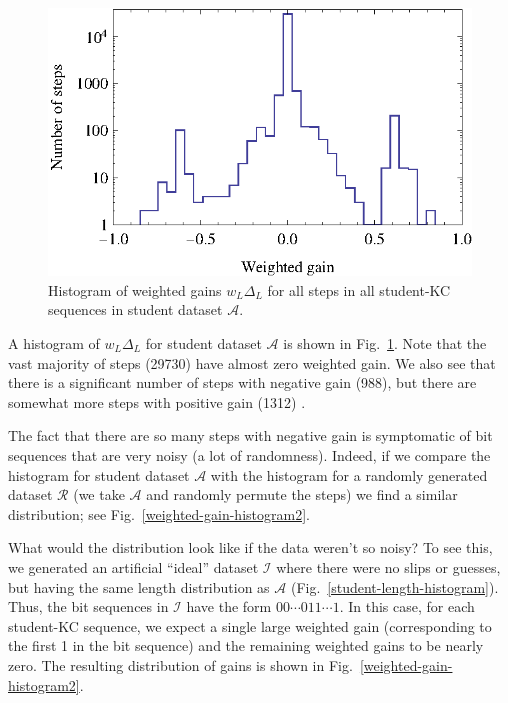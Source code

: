 \documentclass{edm_template}
\begin{document}
\begin{figure}
  \centering \includegraphics{weighted-gain-histogram.eps}
   \caption{Histogram of weighted gains $w_L \Delta_L$ for
     all steps in all student-KC sequences in student dataset $\mathcal{A}$.}
    \label{weighted-gain-histogram}
\end{figure}

A histogram of $w_L
\Delta_L$ for student dataset $\mathcal{A}$ is shown in
Fig.~\ref{weighted-gain-histogram}.  Note that the vast majority of
steps (29730) have almost zero weighted gain.  We also see that there
is a significant number of steps with negative gain (988), but there
are somewhat more steps with positive gain (1312) .

The fact that there are so many steps with negative gain is
symptomatic of bit sequences that are very noisy (a lot of
randomness).  Indeed, if we compare the histogram for student
dataset $\mathcal{A}$ with the histogram for a randomly 
generated dataset $\mathcal{R}$ (we take $\mathcal{A}$ and
randomly permute the steps) we find a similar distribution;
see Fig.~\ref{weighted-gain-histogram2}.

What would the distribution look like if the data weren't 
so noisy?  To see this, we generated an artificial ``ideal'' dataset
$\mathcal{I}$ where there were no slips or guesses, but having
the same length distribution as $\mathcal{A}$ 
(Fig.~\ref{student-length-histogram}).  Thus, the bit sequences
in $\mathcal{I}$ have the form $00\cdots011\cdots1$.
In this case, for each student-KC sequence, we expect a single 
large weighted gain (corresponding to the first 1 in the bit sequence) 
and the remaining weighted gains to be nearly zero.  The resulting 
distribution of gains is shown
in  Fig.~\ref{weighted-gain-histogram2}.
\end{document}
